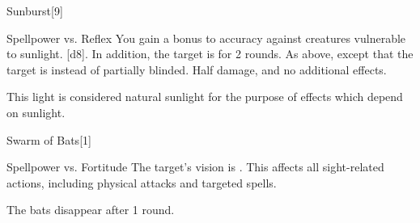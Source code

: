 \begin{spellsection}{Sunburst}[9]
    \begin{spellheader}
    \end{spellheader}
    \begin{spellcontent}
        \begin{spelltargetinginfo}
        \end{spelltargetinginfo}
        \begin{spelleffects}
            \begin{spellattack}{Spellpower vs. Reflex}
                \spellspecial You gain a  bonus to accuracy against creatures vulnerable to sunlight.
                \spellsuccess {}[d8]. In addition, the target is \partiallyblinded for 2 rounds.
                \spellcritical As above, except that the target is \blinded instead of partially blinded.
                \spellfailure Half damage, and no additional effects.
            \end{spellattack}
        \end{spelleffects}
    \end{spellcontent}
    \begin{spellfooter}
        \spellnotes This light is considered natural sunlight for the purpose of effects which depend on sunlight.
        \miscastyou
    \end{spellfooter}
\end{spellsection}

\begin{spellsection}{Swarm of Bats}[1]
    \begin{spellheader}
    \end{spellheader}
    \begin{spellcontent}
        \begin{spelltargetinginfo}
        \end{spelltargetinginfo}
        \begin{spelleffects}
            \begin{spellattack}{Spellpower vs. Fortitude}
                \spellsuccess The target's vision is \impaired. This affects all sight-related actions, including physical attacks and targeted spells.
            \end{spellattack}
        \end{spelleffects}
    \end{spellcontent}
    \begin{spellfooter}
        \spellnotes The bats disappear after 1 round.
        \miscastyou
    \end{spellfooter}
\end{spellsection}

